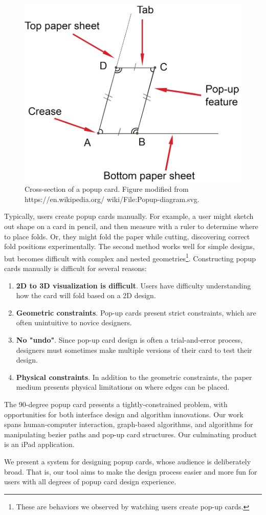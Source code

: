 \begin{figure}[htbp]
\centering
\includegraphics{figures/shared/01_Background/popup-diagram.pdf}
\caption{Cross-section of a popup card. Figure modified from
https://en.wikipedia.org/ wiki/File:Popup-diagram.svg.}
\end{figure}

Typically, users create popup cards manually. For example, a user might
sketch out shape on a card in pencil, and then measure with a ruler to
determine where to place folds. Or, they might fold the paper while
cutting, discovering correct fold positions experimentally. The second
method works well for simple designs, but becomes difficult with complex
and nested geometries\footnote{These are behaviors we observed by
  watching users create pop-up cards.}. Constructing popup cards
manually is difficult for several reasons:

\begin{enumerate}
\def\labelenumi{\arabic{enumi}.}
\itemsep1pt\parskip0pt
\item
  \textbf{2D to 3D visualization is difficult}. Users have difficulty
  understanding how the card will fold based on a 2D design.
\item
  \textbf{Geometric constraints}. Pop-up cards present strict
  constraints, which are often unintuitive to novice designers.
\item
  \textbf{No "undo"}. Since pop-up card design is often a
  trial-and-error process, designers must sometimes make multiple
  versions of their card to test their design.
\item
  \textbf{Physical constraints}. In addition to the geometric
  constraints, the paper medium presents physical limitations on where
  edges can be placed.
\end{enumerate}

The 90-degree popup card presents a tightly-constrained problem, with
opportunities for both interface design and algorithm innovations. Our
work spans human-computer interaction, graph-based algorithms, and
algorithms for manipulating bezier paths and pop-up card structures. Our
culminating product is an iPad application.

We present a system for designing popup cards, whose audience is
deliberately broad. That is, our tool aims to make the design process
easier and more fun for users with all degrees of popup card design
experience.
